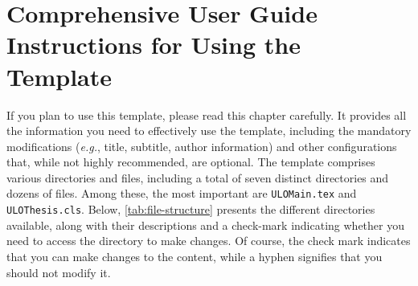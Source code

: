 \chapter[Comprehensive User Guide: Instructions for Using the Template]{Comprehensive User Guide Instructions for Using the Template}
\label{cp:user-guide}

If you plan to use this template, please read this chapter carefully. It provides all the information you need to effectively use the template, including the mandatory modifications (\textit{e.g.}, title, subtitle, author information) and other configurations that, while not highly recommended, are optional. The template comprises various directories and files, including a total of seven distinct directories and dozens of files. Among these, the most important are \texttt{ULOMain.tex} and \texttt{ULOThesis.cls}. Below, \autoref{tab:file-structure} presents the different directories available, along with their descriptions and a check-mark indicating whether you need to access the directory to make changes. Of course, the check mark indicates that you can make changes to the content, while a hyphen signifies that you should not modify it.

